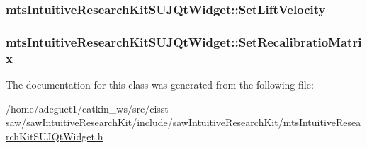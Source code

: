 \hypertarget{classmts_intuitive_research_kit_s_u_j_qt_widget_a45483aaeb40122c980fc3d26fbcfaaec}{
\subsubsection[{Set\-Lift\-Velocity}]{ mts\-Intuitive\-Research\-Kit\-S\-U\-J\-Qt\-Widget\-::\-Set\-Lift\-Velocity\hspace{0.3cm}{\ttfamily [protected]}}}\label{classmts_intuitive_research_kit_s_u_j_qt_widget_a45483aaeb40122c980fc3d26fbcfaaec}
\hypertarget{classmts_intuitive_research_kit_s_u_j_qt_widget_afc6542aa6640463b7f69885a9cbe9eb8}{
\subsubsection[{Set\-Recalibratio\-Matrix}]{ mts\-Intuitive\-Research\-Kit\-S\-U\-J\-Qt\-Widget\-::\-Set\-Recalibratio\-Matrix\hspace{0.3cm}{\ttfamily [protected]}}}\label{classmts_intuitive_research_kit_s_u_j_qt_widget_afc6542aa6640463b7f69885a9cbe9eb8}


The documentation for this class was generated from the following file\-:\begin{DoxyCompactItemize}
\item 
/home/adeguet1/catkin\-\_\-ws/src/cisst-\/saw/saw\-Intuitive\-Research\-Kit/include/saw\-Intuitive\-Research\-Kit/\hyperlink{mts_intuitive_research_kit_s_u_j_qt_widget_8h}{mts\-Intuitive\-Research\-Kit\-S\-U\-J\-Qt\-Widget.\-h}\end{DoxyCompactItemize}
